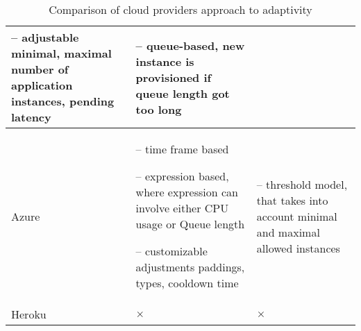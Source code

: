 \begin{table}[!htbp]
\begin{tabularx}{\textwidth}[]{ X  X X }
-- adjustable minimal, maximal number of application instances, pending latency

 &
-- queue-based, new instance is provisioned if queue length got too long 
  \\ \hline

Azure & 
-- time frame based

-- expression based, where expression can involve either CPU usage or Queue length

-- customizable adjustments paddings, types, cooldown time
&
-- threshold model, that takes into account minimal and maximal allowed instances
 \\ \hline

Heroku & $\times$ & $\times$ \\ \hline
\end{tabularx}

\caption{Comparison of cloud providers approach to adaptivity}
\label{tab:cloud-providers-adaptivity}

\end{table}

